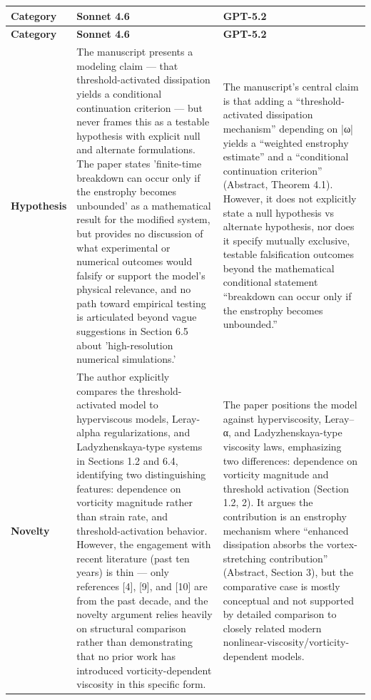\documentclass[11pt]{article}
\begin{document}
\begin{longtable}{@{} p{2.2cm} p{6.3cm} p{6.3cm} @{}}
\toprule
\textbf{Category} & \textbf{Sonnet 4.6} & \textbf{GPT-5.2} \\
\midrule
\endfirsthead
\toprule
\textbf{Category} & \textbf{Sonnet 4.6} & \textbf{GPT-5.2} \\
\midrule
\endhead
\bottomrule
\endlastfoot

\rowcolor{rowgray}
\textbf{Hypothesis} &
The manuscript presents a modeling claim — that threshold-activated dissipation yields a conditional continuation criterion — but never frames this as a testable hypothesis with explicit null and alternate formulations. The paper states 'finite-time breakdown can occur only if the enstrophy becomes unbounded' as a mathematical result for the modified system, but provides no discussion of what experimental or numerical outcomes would falsify or support the model's physical relevance, and no path toward empirical testing is articulated beyond vague suggestions in Section 6.5 about 'high-resolution numerical simulations.' &
The manuscript’s central claim is that adding a “threshold-activated dissipation mechanism” depending on |ω| yields a “weighted enstrophy estimate” and a “conditional continuation criterion” (Abstract, Theorem 4.1). However, it does not explicitly state a null hypothesis vs alternate hypothesis, nor does it specify mutually exclusive, testable falsification outcomes beyond the mathematical conditional statement “breakdown can occur only if the enstrophy becomes unbounded.” \\[6pt]

\textbf{Novelty} &
The author explicitly compares the threshold-activated model to hyperviscous models, Leray-alpha regularizations, and Ladyzhenskaya-type systems in Sections 1.2 and 6.4, identifying two distinguishing features: dependence on vorticity magnitude rather than strain rate, and threshold-activation behavior. However, the engagement with recent literature (past ten years) is thin — only references [4], [9], and [10] are from the past decade, and the novelty argument relies heavily on structural comparison rather than demonstrating that no prior work has introduced vorticity-dependent viscosity in this specific form. &
The paper positions the model against hyperviscosity, Leray–α, and Ladyzhenskaya-type viscosity laws, emphasizing two differences: dependence on vorticity magnitude and threshold activation (Section 1.2, 2). It argues the contribution is an enstrophy mechanism where “enhanced dissipation absorbs the vortex-stretching contribution” (Abstract, Section 3), but the comparative case is mostly conceptual and not supported by detailed comparison to closely related modern nonlinear-viscosity/vorticity-dependent models. \\[6pt]


\end{longtable}
\end{document}
